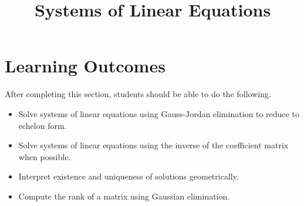 \documentclass{ximera}
\title{Systems of Linear Equations}
\begin{document}
\begin{abstract}

\end{abstract}
 
\maketitle
 
\section*{Learning Outcomes}
After completing this section, students should be able to do the following.
 
\begin{itemize}
    \item Solve systems of linear equations using Gauss-Jordan elimination to reduce to echelon form.
    \item  Solve systems of linear equations using the inverse of the coefficient matrix when possible.
    \item  Interpret existence and uniqueness of solutions geometrically.
    \item  Compute the rank of a matrix using Gaussian elimination.

\end{itemize}

 
\end{document}
